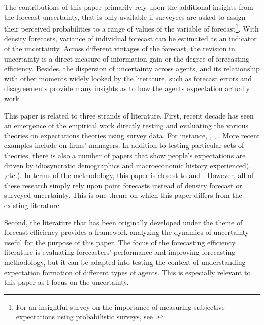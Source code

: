 \documentclass[]{article}
\begin{document}
	The contributions of this paper primarily rely upon the additional insights from the forecast uncertainty, that is only available if surveyees are asked to assign their perceived probabilities to a range of values of the variable of forecast\footnote{For an insightful survey on the importance of measuring subjective expectations using probabilistic surveys, see \citet{manski2004measuring}.}. With density forecasts,  variance of individual forecast can be estimated as an indicator of the uncertainty. Across different vintages of the forecast, the revision in uncertainty is a direct measure of  information gain or the degree of forecasting efficiency. Besides, the dispersion of uncertainty across agents, and its relationship with other moments widely looked by the literature, such as forecast errors and disagreements provide many insights as to how the agents expectation actually work.  
	
	This paper is related to three strands of literature. First, recent decade has seen an emergence of the empirical work directly testing and evaluating the various theories on expectations theories using survey data. For instance, \citet{mankiw2003disagreement}, \citet{carroll2003macroeconomic}, \citet{branch2004theory}. More recent examples include \citet{coibion2018firms} on firms' managers. In addition to testing particular sets of theories, there is also a number of papers that show people's expectations are driven by idiosyncratic demographics and macroeconomic history experienced(\citet{malmendier2015learning}, \citet{das2017socioeconomic},etc.). In terms of the methodology, this paper is closest to \citet{coibion2012can} and \citet{fuhrer2018intrinsic}.  However, all of these research simply rely upon point forecasts instead of density forecast or surveyed uncertainty. This is one theme on which this paper differs from the existing literature.   
	
	Second, the literature that has been originally developed under the theme of forecast efficiency provides a framework analyzing the dynamics of uncertainty useful for the purpose of this paper. The focus of the forecasting efficiency literature is evaluating forecasters' performance and improving forecasting methodology, but it can be adapted into testing the context of understanding expectation formation of different types of agents. This is especially relevant to this paper as I focus on the uncertainty. 
	
\end{document}
